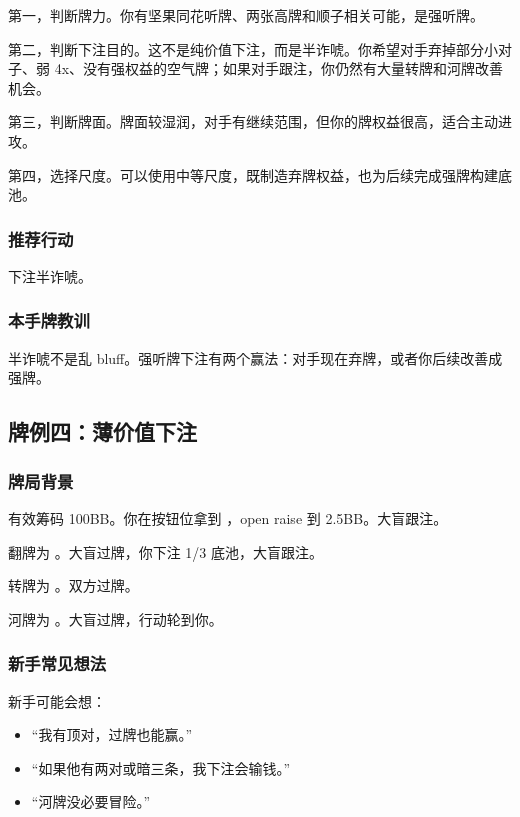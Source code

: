 第一，判断牌力。你有坚果同花听牌、两张高牌和顺子相关可能，是强听牌。

第二，判断下注目的。这不是纯价值下注，而是半诈唬。你希望对手弃掉部分小对子、弱 4x、没有强权益的空气牌；如果对手跟注，你仍然有大量转牌和河牌改善机会。

第三，判断牌面。牌面较湿润，对手有继续范围，但你的牌权益很高，适合主动进攻。

第四，选择尺度。可以使用中等尺度，既制造弃牌权益，也为后续完成强牌构建底池。

\subsubsection*{推荐行动}

下注半诈唬。

\subsubsection*{本手牌教训}

半诈唬不是乱 bluff。强听牌下注有两个赢法：对手现在弃牌，或者你后续改善成强牌。

\subsection{牌例四：薄价值下注}

\subsubsection*{牌局背景}

有效筹码 100BB。你在按钮位拿到 ，open raise 到 2.5BB。大盲跟注。

翻牌为 。大盲过牌，你下注 1/3 底池，大盲跟注。

转牌为 。双方过牌。

河牌为 。大盲过牌，行动轮到你。

\subsubsection*{新手常见想法}

新手可能会想：

\begin{itemize}
\item “我有顶对，过牌也能赢。”
\item “如果他有两对或暗三条，我下注会输钱。”
\item “河牌没必要冒险。”
\end{itemize}

